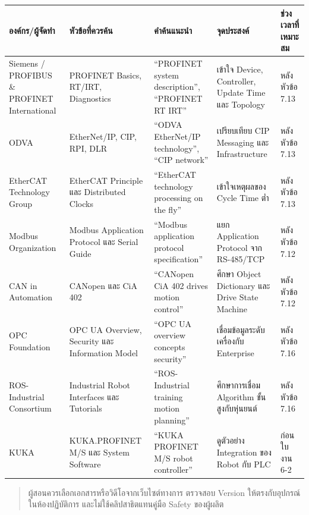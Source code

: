 \begin{table}[htbp]
    \centering
    \small
    \begin{tabularx}{\textwidth}{@{}L{0.20\textwidth} X X X L{0.12\textwidth}@{}}
        \hline
        \textbf{องค์กร/ผู้จัดทำ} & \textbf{หัวข้อที่ควรค้น} & \textbf{คำค้นแนะนำ} & \textbf{จุดประสงค์} & \textbf{ช่วงเวลาที่เหมาะสม} \\
        \hline
        Siemens / PROFIBUS \& PROFINET International & PROFINET Basics, RT/IRT, Diagnostics & “PROFINET system description”, “PROFINET RT IRT” & เข้าใจ Device, Controller, Update Time และ Topology & หลังหัวข้อ 7.13 \\
        ODVA & EtherNet/IP, CIP, RPI, DLR & “ODVA EtherNet/IP technology”, “CIP network” & เปรียบเทียบ CIP Messaging และ Infrastructure & หลังหัวข้อ 7.13 \\
        EtherCAT Technology Group & EtherCAT Principle และ Distributed Clocks & “EtherCAT technology processing on the fly” & เข้าใจเหตุผลของ Cycle Time ต่ำ & หลังหัวข้อ 7.13 \\
        Modbus Organization & Modbus Application Protocol และ Serial Guide & “Modbus application protocol specification” & แยก Application Protocol จาก RS-485/TCP & หลังหัวข้อ 7.12 \\
        CAN in Automation & CANopen และ CiA 402 & “CANopen CiA 402 drives motion control” & ศึกษา Object Dictionary และ Drive State Machine & หลังหัวข้อ 7.12 \\
        OPC Foundation & OPC UA Overview, Security และ Information Model & “OPC UA overview concepts security” & เชื่อมข้อมูลระดับเครื่องกับ Enterprise & หลังหัวข้อ 7.16 \\
        ROS-Industrial Consortium & Industrial Robot Interfaces และ Tutorials & “ROS-Industrial training motion planning” & ศึกษาการเชื่อม Algorithm ขั้นสูงกับหุ่นยนต์ & หลังหัวข้อ 7.16 \\
        KUKA & KUKA.PROFINET M/S และ System Software & “KUKA PROFINET M/S robot controller” & ดูตัวอย่าง Integration ของ Robot กับ PLC & ก่อนใบงาน 6-2 \\
        \hline
    \end{tabularx}
\end{table}

\begin{quote}
ผู้สอนควรเลือกเอกสารหรือวิดีโอจากเว็บไซต์ทางการ ตรวจสอบ Version ให้ตรงกับอุปกรณ์ในห้องปฏิบัติการ และไม่ใช้คลิปสาธิตแทนคู่มือ Safety ของผู้ผลิต
\end{quote}



